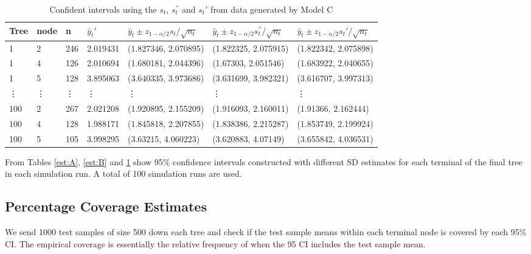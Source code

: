 \begin{table}[H]
	\caption{Confident intervals using the $s_t$, $s^{''}_t$ and $s_t'$ from data generated by Model C  }
	\begin{tiny}
		\begin{tabular}{ |p{1cm}|p{1cm}|p{1cm}|p{1.7cm}|p{3cm}|p{3cm}|p{3cm}|}%
			\hline
			Tree    &node  &n   &$\bar{y}_{t}'$ &$\bar{y}_t \pm z_{1-\alpha/2} s_t /\sqrt{n_t}$&$\bar{y}_t \pm z_{1-\alpha/2} s^{''}_t /\sqrt{n_t}$ &$\bar{y}_t \pm z_{1-\alpha/2} s_t' /\sqrt{n_t}$\\
			\hline
			1&	2&	246&2.019431&(1.827346,	2.070895)&	(1.822325,	2.075915)&(1.822342, 	2.075898)\\

			1&	4&	126&2.010694&(1.680181,	2.044396)&	(1.67303,	2.051546)&(1.683922,	2.040655)\\

			1&	5&	128&3.895063&(3.640335,	3.973686)&	(3.631699,	3.982321)&(3.616707,	3.997313)\\
			\vdots & \vdots & \vdots & \vdots & \vdots & \vdots  & \vdots\\%
			100&2&267&2.021208&	(1.920895,	2.155209)&(1.916093,	2.160011)&(1.91366,	2.162444)
\\
			100&4&128&1.988171&	(1.845818,	2.207855)&(1.838386,	2.215287)&(1.853749,	2.199924)\\

			100&5&105&3.998295&	(3.63215,	4.060223)&(3.620883,	4.07149)&(3.655842,	4.036531)\\
			\hline
		\end{tabular}
		\label{est:C}
	\end{tiny}
\end{table}

From Tables \ref{est:A}, \ref{est:B} and \ref{est:C} show 95\% confidence intervals constructed with different SD estimates for each terminal of the final tree in each simulation run. A total of 100 simulation runs are used.  

\subsection{Percentage Coverage Estimates}
We send 1000 test samples of size 500 down each tree and check if the test sample means within each terminal node is covered by each 95\% CI. The empirical coverage is essentially the relative frequency of when the 95 CI includes the test sample mean. 

